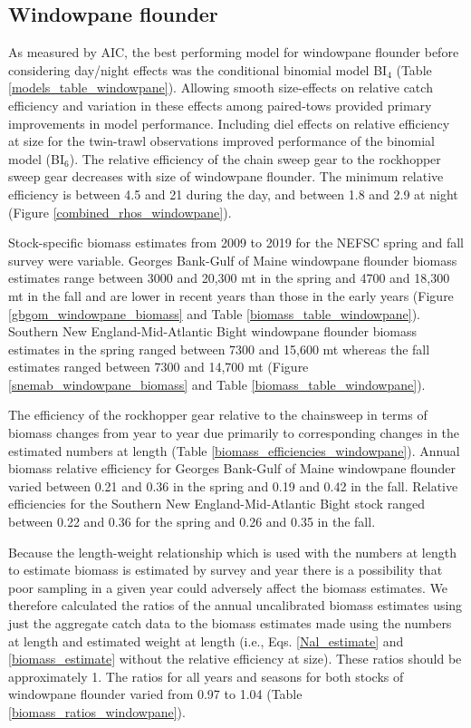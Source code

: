 \documentclass[]{article}
\begin{document}
\hypertarget{windowpane-flounder}{%
\subsection{Windowpane flounder}\label{windowpane-flounder}}

As measured by AIC, the best performing model for windowpane flounder
before considering day/night effects was the conditional binomial model
BI\(_4\) (Table \ref{models_table_windowpane}). Allowing smooth
size-effects on relative catch efficiency and variation in these effects
among paired-tows provided primary improvements in model performance.
Including diel effects on relative efficiency at size for the twin-trawl
observations improved performance of the binomial model (BI\(_6\)). The
relative efficiency of the chain sweep gear to the rockhopper sweep gear
decreases with size of windowpane flounder. The minimum relative
efficiency is between 4.5 and 21 during the day, and between 1.8 and 2.9
at night (Figure \ref{combined_rhos_windowpane}).

Stock-specific biomass estimates from 2009 to 2019 for the NEFSC spring
and fall survey were variable. Georges Bank-Gulf of Maine windowpane
flounder biomass estimates range between 3000 and 20,300 mt in the
spring and 4700 and 18,300 mt in the fall and are lower in recent years
than those in the early years (Figure \ref{gbgom_windowpane_biomass} and
Table \ref{biomass_table_windowpane}). Southern New England-Mid-Atlantic
Bight windowpane flounder biomass estimates in the spring ranged between
7300 and 15,600 mt whereas the fall estimates ranged between 7300 and
14,700 mt (Figure \ref{snemab_windowpane_biomass} and Table
\ref{biomass_table_windowpane}).

The efficiency of the rockhopper gear relative to the chainsweep in
terms of biomass changes from year to year due primarily to
corresponding changes in the estimated numbers at length (Table
\ref{biomass_efficiencies_windowpane}). Annual biomass relative
efficiency for Georges Bank-Gulf of Maine windowpane flounder varied
between 0.21 and 0.36 in the spring and 0.19 and 0.42 in the fall.
Relative efficiencies for the Southern New England-Mid-Atlantic Bight
stock ranged between 0.22 and 0.36 for the spring and 0.26 and 0.35 in
the fall.

Because the length-weight relationship which is used with the numbers at
length to estimate biomass is estimated by survey and year there is a
possibility that poor sampling in a given year could adversely affect
the biomass estimates. We therefore calculated the ratios of the annual
uncalibrated biomass estimates using just the aggregate catch data to
the biomass estimates made using the numbers at length and estimated
weight at length (i.e., Eqs. \ref{Nal_estimate} and
\ref{biomass_estimate} without the relative efficiency at size). These
ratios should be approximately 1. The ratios for all years and seasons
for both stocks of windowpane flounder varied from 0.97 to 1.04 (Table
\ref{biomass_ratios_windowpane}).
\end{document}
